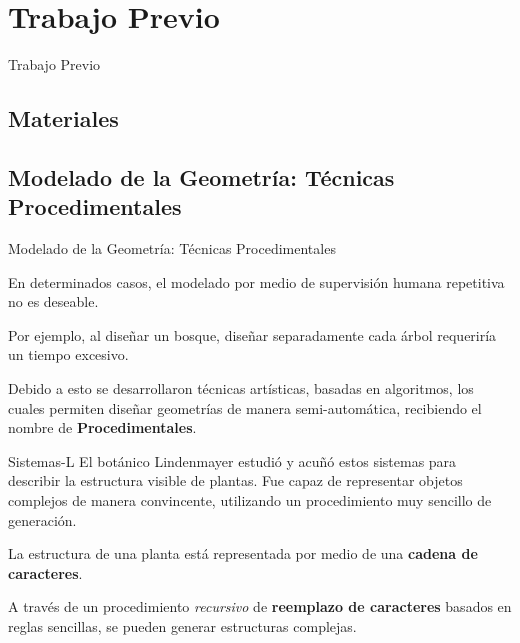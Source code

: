 \documentclass[spanish]{beamer}
\begin{document}
\section{Trabajo Previo}

\begin{frame}
\begin{block}{}
\begin{center}
\vspace{1cm}
\huge{Trabajo Previo}
\vspace{1cm}
\end{center}
\end{block}
\end{frame}

\subsection{Materiales}


\subsection{Modelado de la Geometría: Técnicas Procedimentales}
\begin{frame}{Modelado de la Geometría: Técnicas Procedimentales}

En determinados casos, el modelado por medio de supervisión humana repetitiva no es deseable.

\vspace{0.5cm}
Por ejemplo, al diseñar un bosque, diseñar separadamente cada árbol requeriría un tiempo excesivo.

\vspace{0.5cm}
Debido a esto se desarrollaron técnicas artísticas, basadas en algoritmos, los cuales permiten diseñar geometrías de manera semi-automática, recibiendo el nombre de \textbf{Procedimentales}.

\end{frame}

\begin{frame}{Sistemas-L}
El botánico Lindenmayer estudió y acuñó estos sistemas para describir la estructura visible de plantas. Fue capaz de representar objetos complejos de manera convincente, utilizando un procedimiento muy sencillo de generación.

La estructura de una planta está representada por medio de una \textbf{cadena de caracteres}.

A través de un procedimiento {\it recursivo} de \textbf{reemplazo de caracteres} basados en reglas sencillas, se pueden generar estructuras complejas.

\end{frame}
\end{document}
